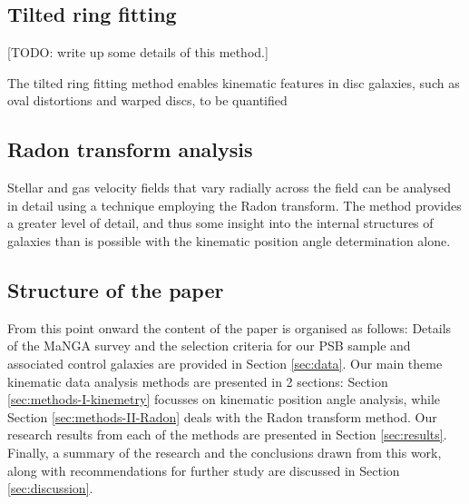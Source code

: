 \subsection{Tilted ring fitting}
\label{sec:tilted-ring-fitting}

[TODO: write up some details of this method.]

The tilted ring fitting method enables kinematic features in disc galaxies, such as oval distortions and warped discs, to be quantified  \citep[see e.g.][]{1978PhDT.......195B,1981AJ.....86.1825B,2007A&A...468..731J}

\subsection{Radon transform analysis} 
Stellar and gas velocity fields that vary radially across the field can be analysed in detail using a technique employing the Radon transform. The method provides a greater level of detail, and thus some insight into the internal structures of galaxies than is possible with the kinematic position angle determination alone.


\subsection{Structure of the paper}
From this point onward the content of the paper is organised as follows: Details of the MaNGA survey and the selection criteria for our PSB sample and associated control galaxies are provided in Section \ref{sec:data}. Our main theme kinematic data analysis methods are presented in 2 sections: Section \ref{sec:methods-I-kinemetry} focusses on kinematic position angle analysis, while Section \ref{sec:methods-II-Radon} deals with the Radon transform method. Our research results from each of the methods are presented in Section \ref{sec:results}. Finally, a summary of the research and the conclusions drawn from this work, along with recommendations for further study are discussed in Section \ref{sec:discussion}.

